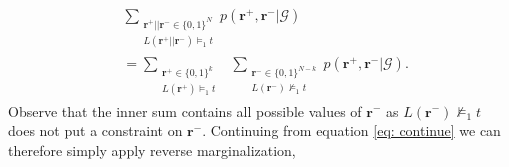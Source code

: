 \documentclass{article}
\theoremstyle{plain}
\theoremstyle{remark}
\newcommand{\vecallrules}{\mathbf{\Tilde{r}}}
\newcommand{\vecallfiredrules}{\mathbf{r}}
\newcommand{\alltriples}{\mathcal{G}}
\begin{document}
\begin{align}
     &\sum\limits_{\substack{ \mathbf{r}^+ || \mathbf{r}^{-} \in \{0, 1\}^N \\ L(\vecallfiredrules^{+} || \mathbf{r}^-) \models_1 t}} p(\mathbf{r}^+, \mathbf{r}^- | \alltriples) \\
    &= \sum\limits_{\substack{ \mathbf{r}^+ \in \{0, 1\}^k \\ L(\mathbf{r}^+) \models_1 t}} 
    \; \; \sum\limits_{\substack{ \mathbf{r}^{-} \in \{0, 1\}^{N-k} \\  L(\mathbf{r}^-) \not\models_1 t}} p(\mathbf{r}^+, \mathbf{r}^{-} | \alltriples). \label{eq: continue}
\end{align}
Observe that the inner sum contains all possible values of $\mathbf{r}^{-}$ as $ L(\mathbf{r}^-) \not\models_1 t$ does not put a constraint on $\mathbf{r}^-$. Continuing from equation \eqref{eq: continue} we can therefore simply apply reverse marginalization,
\end{document}

